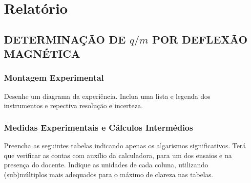 \documentclass[a4paper,12pt]{article}  %
\begin{document}
\section{\sf Relatório}
\subsection{\sf DETERMINAÇÃO DE $q/m$ POR  DEFLEXÃO MAGNÉTICA}
\subsubsection{\sf Montagem Experimental}
Desenhe um diagrama da experiência. Inclua uma lista e legenda dos instrumentos e repectiva resolução e incerteza.
\begin{center}
\framebox[18cm]{\rule{0pt}{10cm}}
\end{center}





\subsubsection{\sf Medidas Experimentais e Cálculos Intermédios } \label{sec:dados}
Preencha as seguintes tabelas indicando apenas os algarismos significativos. Terá que verificar as contas com auxílio da calculadora, para um dos ensaios e na presença do docente. Indique as unidades de cada coluna, utilizando (sub)múltiplos mais adequados para o máximo de clareza nas tabelas.
\end{document}
